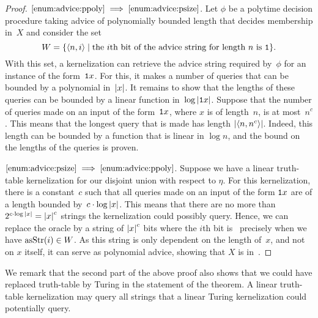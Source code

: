 \begin{proof}
$\ref{enum:advice:ppoly} \implies \ref{enum:advice:psize}$.
  Let $\phi$ be a polytime decision procedure taking advice of polynomially bounded length that decides membership in~$X$ and consider the set
  \begin{equation*}
    W = \{{\langle n, i\rangle} \;|\; \text{the $i$th bit of the advice string for length~$n$ is \textnormal{\texttt{1}}}\}.
  \end{equation*}
  With this set, a kernelization can retrieve the advice string required by~$\phi$ for an instance of the form~$\textnormal{\texttt{1}}x$.
  For this, it makes a number of queries that can be bounded by a polynomial in~${\lvert x\rvert}$.
  It remains to show that the lengths of these queries can be bounded by a linear function in~$\log {\lvert\textnormal{\texttt{1}}x\rvert}$.
  Suppose that the number of queries made on an input of the form~$\textnormal{\texttt{1}}x$, where $x$ is of length~$n$, is at most~$n^c$.
  This means that the longest query that is made has length ${\lvert{\langle n, n^c\rangle}\rvert}$.
  Indeed, this length can be bounded by a function that is linear in $\log n$, and the bound on the lengths of the queries is proven.

$\ref{enum:advice:psize} \implies \ref{enum:advice:ppoly}$.
  Suppose we have a linear truth-table kernelization for our disjoint union with respect to $\eta$.
  For this kernelization, there is a constant~$c$ such that all queries made on an input of the form $\textnormal{\texttt{1}}x$ are of a length bounded by~$c \cdot \log {\lvert x\rvert}$.
  This means that there are no more than $2^{c \cdot \log {\lvert x\rvert}} = {\lvert x\rvert}^c$ strings the kernelization could possibly query.
  Hence, we can replace the oracle by a string of ${\lvert x\rvert}^c$ bits where the $i$th bit is~ precisely when we have $\operatorname{asStr}(i) \in W$.
  As this string is only dependent on the length of~$x$, and not on $x$ itself, it can serve as polynomial advice, showing that $X$ is in~.
\end{proof}

We remark that the second part of the above proof also shows that we could have replaced truth-table by Turing in the statement of the theorem.
A linear truth-table kernelization may query all strings that a linear Turing kernelization could potentially query.

